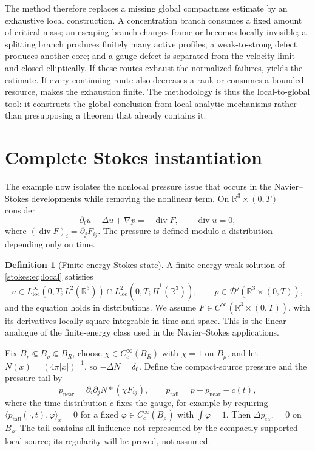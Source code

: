 \documentclass[11pt,reqno]{amsart}
\theoremstyle{plain}
\theoremstyle{definition}
\newtheorem{definition}[definition]{Definition}
\theoremstyle{remark}
\numberwithin{equation}{section}
\newcommand{\R}{\mathbb R}
\newcommand{\divergence}{\operatorname{div}}
\newcommand{\loc}{\mathrm{loc}}
\begin{document}
The method therefore replaces a missing global compactness estimate by an
exhaustive local construction.  A concentration branch consumes a fixed amount
of critical mass; an escaping branch changes frame or becomes locally
invisible; a splitting branch produces finitely many active profiles; a
weak-to-strong defect produces another core; and a gauge defect is separated
from the velocity limit and closed elliptically.  If these routes exhaust the
normalized failures,  yields the estimate.
If every continuing route also decreases a rank or consumes a bounded resource,
 makes the exhaustion finite.  The methodology
is thus the local-to-global tool: it constructs the global conclusion from
local analytic mechanisms rather than presupposing a theorem that already
contains it.

\section{Complete Stokes instantiation}
\label{sec:stokes}

The example now isolates the nonlocal pressure issue that occurs in the
Navier--Stokes developments while removing the nonlinear term.  On
\(\R^3\times(0,T)\) consider
\begin{equation}\label{stokes:eq:local}
  \partial_tu-\Delta u+\nabla p=-\divergence F,
  \qquad \divergence u=0,
\end{equation}
where \((\divergence F)_i=\partial_jF_{ij}\).  The pressure is defined modulo
a distribution depending only on time.

\begin{definition}[Finite-energy Stokes state]\label{stokes:def:energy-state}
A finite-energy weak solution of \eqref{stokes:eq:local} satisfies
\[
 u\in L^\infty_{\loc}(0,T;L^2(\R^3))
 \cap L^2_{\loc}(0,T;\dot H^1(\R^3)),
 \qquad p\in\mathcal D'(\R^3\times(0,T)),
\]
and the equation holds in distributions.  We assume
\(F\in C^\infty(\R^3\times(0,T))\), with its derivatives locally square
integrable in time and space.  This is the linear analogue of the
finite-energy class used in the Navier--Stokes applications.
\end{definition}

Fix \(B_r\Subset B_\rho\Subset B_R\), choose
\(\chi\in C_c^\infty(B_R)\) with \(\chi=1\) on \(B_\rho\), and let
\(N(x)=(4\pi|x|)^{-1}\), so \(-\Delta N=\delta_0\).  Define the compact-source
pressure and the pressure tail by
\begin{equation}\label{stokes:eq:pressure-split}
 p_{\mathrm{near}}=\partial_i\partial_jN*(\chi F_{ij}),
 \qquad p_{\mathrm{tail}}=p-p_{\mathrm{near}}-c(t),
\end{equation}
where the time distribution \(c\) fixes the gauge, for example by requiring
\(\langle p_{\mathrm{tail}}(\cdot,t),\varphi\rangle_x=0\) for a fixed
\(\varphi\in C_c^\infty(B_\rho)\) with \(\int\varphi=1\).  Then
\(\Delta p_{\mathrm{tail}}=0\) on \(B_\rho\).  The tail contains all influence
not represented by the compactly supported local source; its regularity will
be proved, not assumed.
\end{document}
